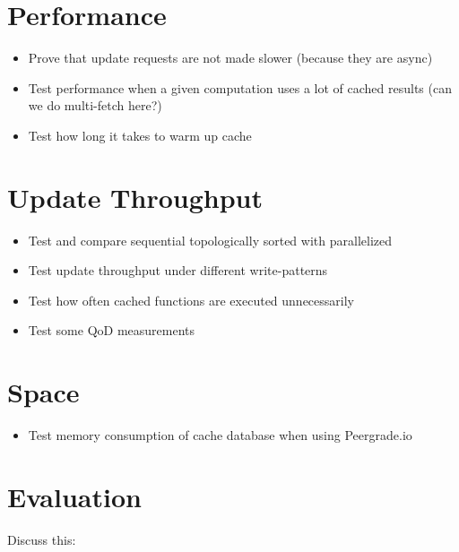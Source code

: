 \section{Performance}
\label{sec:performance}

\begin{itemize}
  \item Prove that update requests are not made slower (because they are async)
  \item Test performance when a given computation uses a lot of cached results (can we do multi-fetch here?)
  \item Test how long it takes to warm up cache
\end{itemize}


\section{Update Throughput}
\label{sec:update-throughput}

\begin{itemize}
  \item Test and compare sequential topologically sorted with parallelized
  \item Test update throughput under different write-patterns
  \item Test how often cached functions are executed unnecessarily
  \item Test some QoD measurements
\end{itemize}


\section{Space}
\label{sec:space}

\begin{itemize}
  \item Test memory consumption of cache database when using Peergrade.io
\end{itemize}


\section{Evaluation}
\label{sec:evaluation}


Discuss this:

